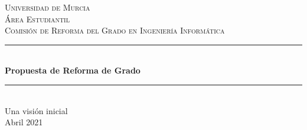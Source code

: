 \begin{titlepage}

\newcommand{\HRule}{\rule{\linewidth}{0.5mm}}

\center %


\textsc{\LARGE Universidad de Murcia}\\[1.5cm]
\textsc{\Large
Área Estudiantil \\
Comisión de Reforma del Grado en Ingeniería Informática}\\[0.5cm]


\HRule \\[0.4cm]
{ \huge \bfseries
    Propuesta de Reforma de Grado
} \\[0.4cm]
\HRule \\[0.5cm]

{\large Una visión inicial}\\[2cm]



{\large Abril 2021}\\[2cm]

\end{titlepage}
